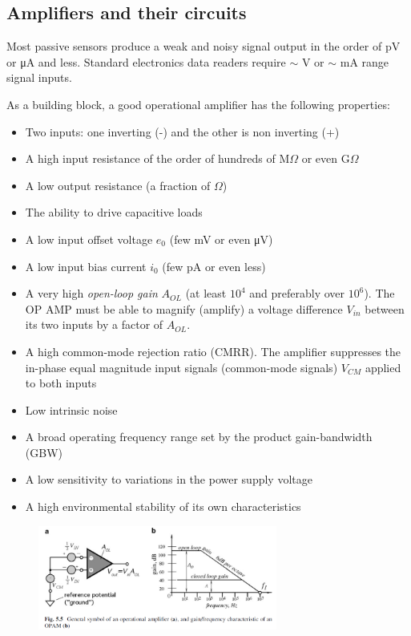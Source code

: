 \subsection{Amplifiers and their circuits}

Most passive sensors produce a weak and
noisy signal output in the order of pV or \si{\micro A} and
less. Standard electronics data readers require $\sim$ V
or $\sim$ mA range signal inputs.

As a building block, a good operational amplifier has the following properties:

\begin{itemize}
    \item Two inputs: one inverting (-) and the other is non inverting (+)
    \item A high input resistance of the order of hundreds
of M$\Omega$ or even G$\Omega$
    \item A low output resistance (a fraction of $\Omega$)
    \item The ability to drive capacitive loads
    \item A low input offset voltage $e_0$ (few mV or even \si{\micro V})
    \item A low input bias current $i_0$ (few pA or even less)
    \item A very high \textit{open-loop gain} $A_{OL}$ (at least $10^4$ and
    preferably over $10^6$). The OP AMP must be
    able to magnify (amplify) a voltage difference $V_{in}$
    between its two inputs by a factor of $A_{OL}$.
    \item A high common-mode rejection ratio (CMRR). The amplifier suppresses the in-phase
    equal magnitude input signals (common-mode
    signals) $V_{CM}$ applied to both inputs
    \item Low intrinsic noise
    \item A broad operating frequency range set by the
    product gain-bandwidth (GBW)
    \item A low sensitivity to variations in the power supply
    voltage
    \item A high environmental stability of its own
characteristics
\end{itemize}

\begin{figure}[H]
    \centering
    \includegraphics[width = 0.7\textwidth]{L4/img/amp.PNG}
\end{figure}

